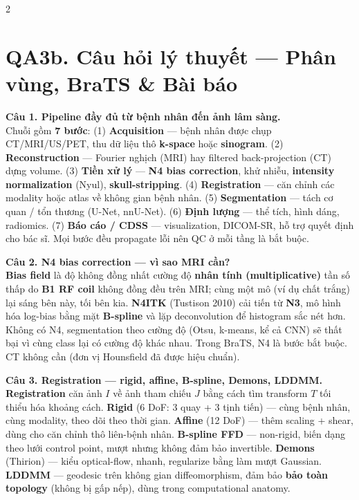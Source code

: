 \begin{paracol}{2}
\switchcolumn

\section*{QA3b. Câu hỏi lý thuyết — Phân vùng, BraTS \& Bài báo}

\textbf{Câu 1. Pipeline đầy đủ từ bệnh nhân đến ảnh lâm sàng.}\\
Chuỗi gồm \textbf{7 bước}: (1) \textbf{Acquisition} — bệnh nhân được chụp CT/MRI/US/PET, thu dữ liệu thô \textbf{k-space} hoặc \textbf{sinogram}. (2) \textbf{Reconstruction} — Fourier nghịch (MRI) hay filtered back-projection (CT) dựng volume. (3) \textbf{Tiền xử lý} — \textbf{N4 bias correction}, khử nhiễu, \textbf{intensity normalization} (Nyul), \textbf{skull-stripping}. (4) \textbf{Registration} — căn chỉnh các modality hoặc atlas về không gian bệnh nhân. (5) \textbf{Segmentation} — tách cơ quan / tổn thương (U-Net, nnU-Net). (6) \textbf{Định lượng} — thể tích, hình dáng, radiomics. (7) \textbf{Báo cáo / CDSS} — visualization, DICOM-SR, hỗ trợ quyết định cho bác sĩ. Mọi bước đều propagate lỗi nên QC ở mỗi tầng là bắt buộc.

\textbf{Câu 2. N4 bias correction — vì sao MRI cần?}\\
\textbf{Bias field} là độ không đồng nhất cường độ \textbf{nhân tính (multiplicative)} tần số thấp do \textbf{B1 RF coil} không đồng đều trên MRI; cùng một mô (ví dụ chất trắng) lại sáng bên này, tối bên kia. \textbf{N4ITK} (Tustison 2010) cải tiến từ \textbf{N3}, mô hình hóa log-bias bằng mặt \textbf{B-spline} và lặp deconvolution để histogram sắc nét hơn. Không có N4, segmentation theo cường độ (Otsu, k-means, kể cả CNN) sẽ thất bại vì cùng class lại có cường độ khác nhau. Trong BraTS, N4 là bước bắt buộc. CT không cần (đơn vị Hounsfield đã được hiệu chuẩn).

\textbf{Câu 3. Registration — rigid, affine, B-spline, Demons, LDDMM.}\\
\textbf{Registration} căn ảnh $I$ về ảnh tham chiếu $J$ bằng cách tìm transform $T$ tối thiểu hóa khoảng cách. \textbf{Rigid} (6 DoF: 3 quay + 3 tịnh tiến) — cùng bệnh nhân, cùng modality, theo dõi theo thời gian. \textbf{Affine} (12 DoF) — thêm scaling + shear, dùng cho căn chỉnh thô liên-bệnh nhân. \textbf{B-spline FFD} — non-rigid, biến dạng theo lưới control point, mượt nhưng không đảm bảo invertible. \textbf{Demons} (Thirion) — kiểu optical-flow, nhanh, regularize bằng làm mượt Gaussian. \textbf{LDDMM} — geodesic trên không gian diffeomorphism, đảm bảo \textbf{bảo toàn topology} (không bị gấp nếp), dùng trong computational anatomy.


\end{paracol}
